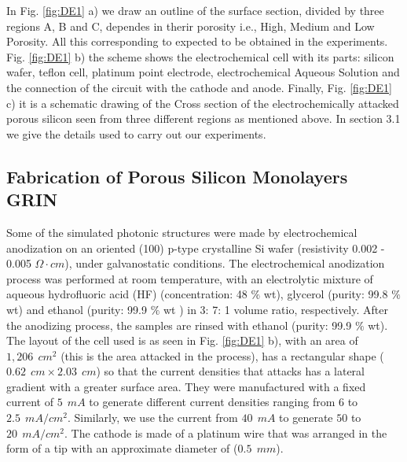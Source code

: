 \documentclass{article}
\begin{document}
In Fig. \ref{fig:DE1} a) we draw an outline of the surface section,
divided by three regions A, B and C, dependes in therir porosity i.e.,
High, Medium and Low Porosity. All this corresponding to  expected to
be obtained in the experiments. Fig. \ref{fig:DE1} b) the scheme shows
the electrochemical cell with its parts: silicon wafer, teflon cell,
platinum point electrode, electrochemical Aqueous Solution and the
connection of the circuit with the cathode and anode. Finally,
Fig. \ref{fig:DE1} c) it is a schematic drawing of the Cross section
of the electrochemically attacked porous silicon seen from three
different regions as mentioned above. In section 3.1 we give the
details used to carry out our experiments.

\subsection{Fabrication of Porous Silicon Monolayers GRIN}
Some of the simulated photonic structures were made by electrochemical
anodization on an oriented (100) p-type crystalline Si wafer
(resistivity 0.002 - 0.005 $ \Omega \cdot cm $), under galvanostatic
conditions. The electrochemical anodization process was performed at
room temperature, with an electrolytic mixture of aqueous hydrofluoric
acid (HF) (concentration: 48 $ \% $ wt), glycerol (purity: 99.8 $ \% $
wt) and ethanol (purity: 99.9 $ \%$ wt ) in 3: 7: 1 volume ratio,
respectively. After the anodizing process, the samples are rinsed with
ethanol (purity: 99.9 $ \% $  wt). The layout of the cell used is as
seen in Fig. \ref{fig:DE1} b), with an area of $ 1,206 \ \ cm^2 $
(this is the area attacked in the process), has a rectangular shape ($
0.62 \ \ cm \times 2.03 \ \ cm $)  so that the current densities  that
attacks has a lateral gradient with a greater surface area. They were
manufactured with a fixed current of $ 5 \ \ mA $ to generate
different current densities ranging from $ 6  $ to $ 2.5 \ \ mA / cm^2
$. Similarly, we use the current from $ 40 \ \ mA $ to generate $ 50 $
to $ 20 \ \ mA / cm ^ 2 $. The cathode is made of a platinum wire that
was arranged in the form of a tip with an approximate diameter of ($
0.5 \ \ mm $).
\end{document}

